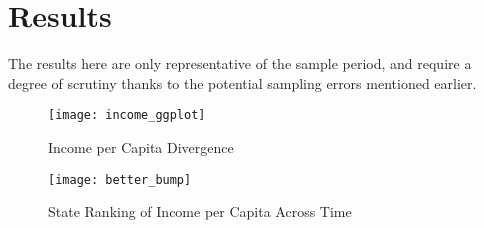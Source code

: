 \documentclass[a4paper, 11pt]{article}
\begin{document}
\section{Results}
The results here are only representative of the sample period, and require a degree of scrutiny thanks to the potential sampling errors mentioned earlier.  \par

\begin{figure}[!htbp]
\texttt{[image: income\_ggplot]}
\caption{Income per Capita Divergence}
\end{figure}
\par

\begin{figure}[!htbp]
\texttt{[image: better\_bump]}
\caption{State Ranking of Income per Capita Across Time}
\end{figure}
\par
\end{document}
